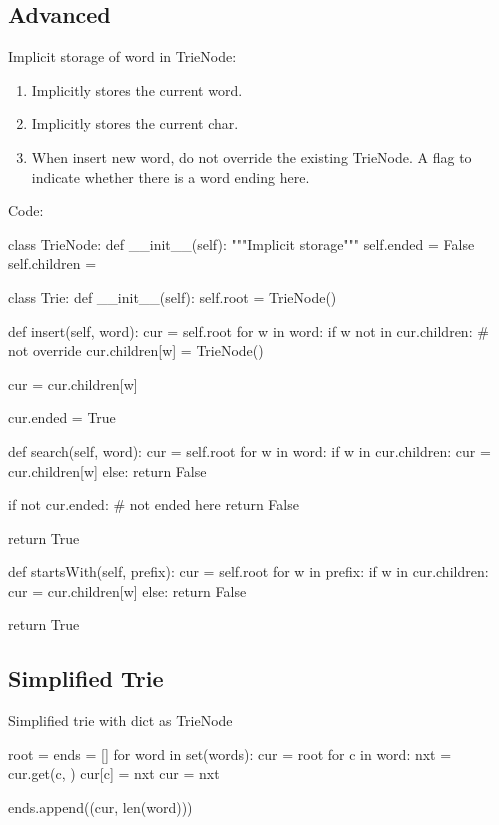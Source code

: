 \subsection{Advanced}
Implicit storage of word in TrieNode: 
\begin{enumerate}
\item Implicitly stores the current word. 
\item Implicitly stores the current char. 
\item When insert new word, do not override the existing TrieNode. A flag to indicate
whether there is a word ending here.
\end{enumerate}
\newpage
Code:
\begin{python}
class TrieNode:
    def __init__(self):
        """Implicit storage"""
        self.ended = False
        self.children = {}


class Trie:
    def __init__(self):
        self.root = TrieNode()

    def insert(self, word):
        cur = self.root
        for w in word:
            if w not in cur.children:   # not override
                cur.children[w] = TrieNode()

            cur = cur.children[w]

        cur.ended = True

    def search(self, word):
        cur = self.root
        for w in word:
            if w in cur.children:
                cur = cur.children[w]
            else:
                return False

        if not cur.ended:  # not ended here
            return False

        return True

    def startsWith(self, prefix):
        cur = self.root
        for w in prefix:
            if w in cur.children:
                cur = cur.children[w]
            else:
                return False

        return True
\end{python}
\subsection{Simplified Trie}
Simplified trie with dict as TrieNode
\begin{python}
root = {}
ends = []
for word in set(words):
    cur = root
    for c in word:
        nxt = cur.get(c, {})
        cur[c] = nxt
        cur = nxt

    ends.append((cur, len(word)))
\end{python}
